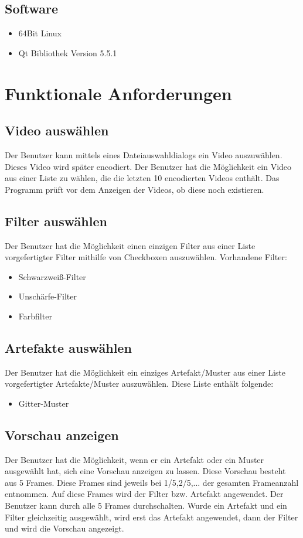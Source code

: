 \documentclass[parskip=full]{scrartcl}
\begin{document}
\subsection{Software}
\begin{itemize}
\item 64Bit Linux
\item Qt Bibliothek Version 5.5.1
\end{itemize}
\newpage
\section{Funktionale Anforderungen}
\subsection{Video auswählen}
Der Benutzer kann mittels eines Dateiauswahldialogs ein Video auszuwählen. Dieses
Video wird später encodiert. Der Benutzer hat die Möglichkeit ein Video aus einer Liste zu wählen, die die letzten 10 encodierten
Videos enthält. Das Programm prüft vor dem Anzeigen der Videos, ob diese noch existieren.
\subsection{Filter auswählen}
Der Benutzer hat die Möglichkeit einen einzigen Filter aus einer Liste vorgefertigter Filter mithilfe von Checkboxen auszuwählen. Vorhandene Filter:
\begin{itemize}
\item Schwarzweiß-Filter
\item Unschärfe-Filter
\item Farbfilter
\end{itemize}
\subsection{Artefakte auswählen}
Der Benutzer hat die Möglichkeit ein einziges Artefakt/Muster aus einer Liste vorgefertigter
Artefakte/Muster auszuwählen. Diese Liste enthält folgende:
\begin{itemize}
\item Gitter-Muster
\end{itemize}
\subsection{Vorschau anzeigen}
Der Benutzer hat die Möglichkeit, wenn er ein Artefakt oder ein Muster ausgewählt hat, sich eine
Vorschau anzeigen zu lassen. Diese Vorschau besteht aus 5 Frames. Diese Frames sind jeweils bei
1/5,2/5,... der gesamten Frameanzahl entnommen. Auf diese Frames wird der Filter bzw. Artefakt
angewendet. Der Benutzer kann durch alle 5 Frames durchschalten. Wurde ein Artefakt und ein Filter
gleichzeitig ausgewählt, wird erst das Artefakt angewendet, dann der Filter und wird die
Vorschau angezeigt.
\end{document}
